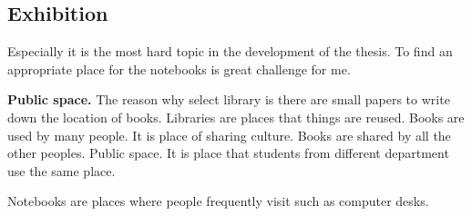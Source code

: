 






%
%
\subsection{Exhibition}
Especially it is the most hard topic in the development of the thesis. To find an appropriate place for the notebooks is great challenge for me.

\textbf{Public space.} The reason why select library is there are small papers to write down the location of books. Libraries are places that things are reused. Books are used by many people. It is place of sharing culture. Books are shared by all the other peoples. Public space. It is place that students from different department use the same place.

Notebooks are places where people frequently visit such as computer desks.


